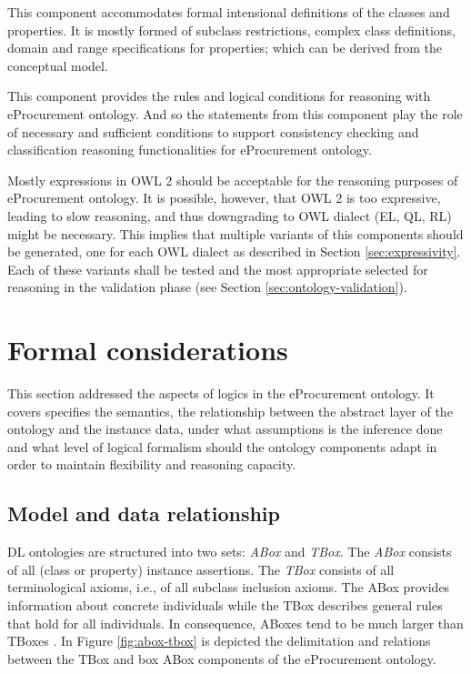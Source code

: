 	This component accommodates formal intensional definitions of the classes and properties. It is mostly formed of subclass restrictions, complex class definitions, domain and range specifications for properties; which can be derived from the conceptual model. 
	
	This component provides the rules and logical conditions for reasoning with eProcurement ontology. And so the statements from this component play the role of necessary and sufficient conditions to support consistency checking and classification reasoning functionalities for eProcurement ontology. 
	
	Mostly expressions in OWL 2 should be acceptable for the reasoning purposes of eProcurement ontology. It is possible, however, that OWL 2 is too expressive, leading to slow reasoning, and thus downgrading to OWL dialect (EL, QL, RL) might be necessary. This implies that multiple variants of this components should be generated, one for each OWL dialect as described in Section \ref{sec:expressivity}. Each of these variants shall be tested and the most appropriate selected for reasoning in the validation phase (see Section \ref{sec:ontology-validation}). 
		
		
\section{Formal considerations}	
\label{sec:formal-considerations}

	This section addressed the aspects of logics in the eProcurement ontology. It covers specifies the semantics, the relationship between the abstract layer of the ontology and the instance data, under what assumptions is the inference done and what level of logical formalism should the ontology components adapt in order to maintain flexibility and reasoning capacity. 
	
	\subsection{Model and data relationship}
	\label{sec:model-data}
	
	DL ontologies are structured into two sets: \textit{ABox} and \textit{TBox}. The \textit{ABox} consists of all (class or property) instance assertions. The \textit{TBox} consists of all terminological axioms, i.e., of all subclass inclusion axioms. The ABox provides information about concrete individuals while the TBox describes general rules that hold for all individuals. In consequence, ABoxes tend to be much larger than TBoxes \citep{krotzsch2012owl}. In Figure \ref{fig:abox-tbox} is depicted the delimitation and relations between the TBox and box ABox components of the eProcurement ontology.
	
